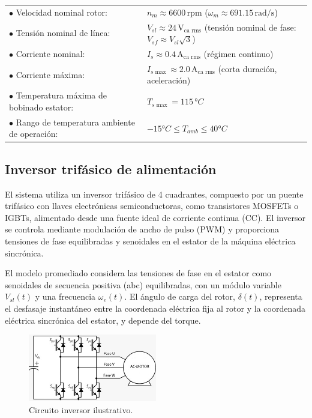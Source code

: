 \documentclass{article}
\begin{document}
    \begin{tabular}{@{} p{} p{} @{}}
        \(\bullet\) Velocidad nominal rotor: & \(n_m \approx 6600 \, \text{rpm}\) (\(\omega_m \approx 691.15 \, \text{rad/s}\)) \\
        \(\bullet\) Tensión nominal de línea: & \(V_{sl} \approx 24 \, \text{V}_{\text{ca rms}}\) (tensión nominal de fase: \(V_{sf} \approx V_{sl} \sqrt{3}\)) \\
        \(\bullet\) Corriente nominal: & \(I_s \approx 0.4 \, \text{A}_{\text{ca rms}}\) (régimen continuo) \\
        \(\bullet\) Corriente máxima: & \(I_{s \max} \approx 2.0 \, \text{A}_{\text{ca rms}}\) (corta duración, aceleración) \\
        \(\bullet\) Temperatura máxima de bobinado estator: & \(T_{s \max} = 115 \, °C\) \\
        \(\bullet\) Rango de temperatura ambiente de operación: & \(-15 °C \leq T_{amb} \leq 40 °C\)
    \end{tabular}

\subsection{Inversor trifásico de alimentación}

El sistema utiliza un inversor trifásico de 4 cuadrantes, compuesto por un puente trifásico con llaves 
electrónicas semiconductoras, como transistores MOSFETs o IGBTs, alimentado desde una fuente ideal de 
corriente continua (CC). El inversor se controla mediante modulación de ancho de pulso (PWM) y proporciona 
tensiones de fase equilibradas y senoidales en el estator de la máquina eléctrica sincrónica.

El modelo promediado considera las tensiones de fase en el estator como senoidales de secuencia positiva 
(abc) equilibradas, con un módulo variable $V_{sl}(t)$ y una frecuencia $\omega_e(t)$. El ángulo de carga del rotor, 
$\delta (t)$, representa el desfasaje instantáneo entre la coordenada eléctrica fija al rotor y la coordenada 
eléctrica sincrónica del estator, y depende del torque.

\begin{figure}[H]
    \centering
    \includegraphics[width=0.5\textwidth]{Alan7.jpg}
    \caption{Circuito inversor ilustrativo.}
\end{figure}
\end{document}
